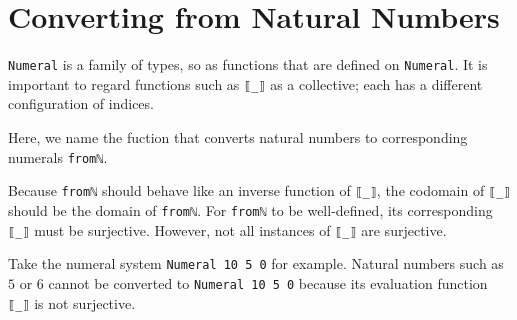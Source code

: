 \documentclass[\main/thesis.tex]{subfiles}
\begin{document}
\section{Converting from Natural Numbers}\label{fromnat}

\lstinline|Numeral| is a family of types, so as functions that are defined on
\lstinline|Numeral|.
It is important to regard functions such as \lstinline|⟦_⟧| as a collective;
each has a different configuration of indices.

Here, we name the fuction that converts natural numbers to corresponding
numerals \lstinline|fromℕ|.

\begin{center}
\end{center}

Because \lstinline|fromℕ| should behave like an inverse function of \lstinline|⟦_⟧|,
the codomain of \lstinline|⟦_⟧| should be the domain of \lstinline|fromℕ|.
For \lstinline|fromℕ| to be well-defined, its corresponding \lstinline|⟦_⟧|
must be surjective.
However, not all instances of \lstinline|⟦_⟧| are surjective.

Take the numeral system \lstinline|Numeral 10 5 0| for example.
Natural numbers such as $ 5 $ or $ 6 $ cannot be converted to
\lstinline|Numeral 10 5 0| because its evaluation function \lstinline|⟦_⟧|
is not surjective.
\end{document}
